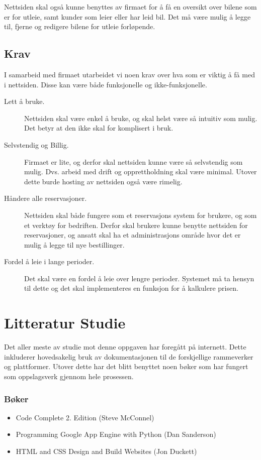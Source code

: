 Nettsiden skal også kunne benyttes av firmaet for å få en oversikt over bilene som er for utleie, samt kunder som leier eller har leid bil. Det må være mulig å legge til, fjerne og redigere bilene for utleie forløpende.


\subsection{Krav}
I samarbeid med firmaet utarbeidet vi noen krav over hva som er viktig å få med i nettsiden. Disse kan være både funksjonelle og ikke-funksjonelle.
\begin{description}
\item[Lett å bruke.]Nettsiden skal være enkel å bruke, og skal helst være så intuitiv som mulig. Det betyr at den ikke skal for komplisert i bruk.
\item[Selvstendig og Billig.]Firmaet er lite, og derfor skal nettsiden kunne være så selvstendig som mulig. Dvs. arbeid med drift og opprettholdning skal være minimal. Utover dette burde hosting av nettsiden også være rimelig.
\item[Håndere alle reservasjoner.]Nettsiden skal både fungere som et reservasjons system for brukere, og som et verktøy for bedriften. Derfor skal brukere kunne benytte nettsiden for reservasjoner, og ansatt skal ha et administrasjons område hvor det er mulig å legge til nye bestillinger.
\item[Fordel å leie i lange perioder.]Det skal være en fordel å leie over lengre perioder. Systemet må ta hensyn til dette og det skal implementeres en funksjon for å kalkulere prisen.
\end{description}

\section{Litteratur Studie}
Det aller meste av studie mot denne oppgaven har foregått på internett. Dette inkluderer hovedsakelig bruk av dokumentasjonen til de forskjellige rammeverker og plattformer. Utover dette har det blitt benyttet noen bøker som har fungert som oppslagsverk gjennom hele prosessen.

\subsubsection*{Bøker}
\begin{itemize}
\item Code Complete 2. Edition (Steve McConnel)
\item Programming Google App Engine with Python (Dan Sanderson)
\item HTML and CSS Design and Build Websites (Jon Duckett)
\end{itemize}

